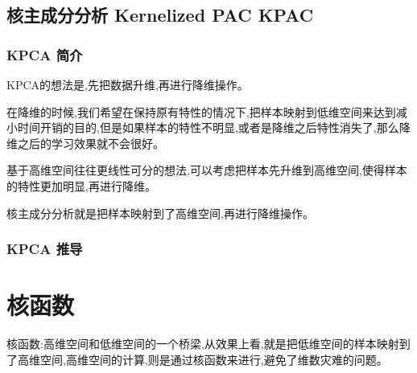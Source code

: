 \documentclass[UTF8,a4paper]{ctexart}%
\begin{document}
      \subsection{核主成分分析 Kernelized PAC KPAC}
          \subsubsection{KPCA 简介}
              KPCA的想法是,先把数据升维,再进行降维操作。

              {\color{blue}
              在降维的时候,我们希望在保持原有特性的情况下,把样本映射到低维空间来达到减小时间开销的目的,但是如果样本的特性不明显,或者是降维之后特性消失了,那么降维之后的学习效果就不会很好。

              基于高维空间往往更线性可分的想法,可以考虑把样本先升维到高维空间,使得样本的特性更加明显,再进行降维。

              核主成分分析就是把样本映射到了高维空间,再进行降维操作。
              }

          \subsubsection{KPCA 推导}


    \section{核函数}
        核函数:高维空间和低维空间的一个桥梁,从效果上看,就是把低维空间的样本映射到了高维空间,高维空间的计算,则是通过核函数来进行,避免了维数灾难的问题。
\end{document}
